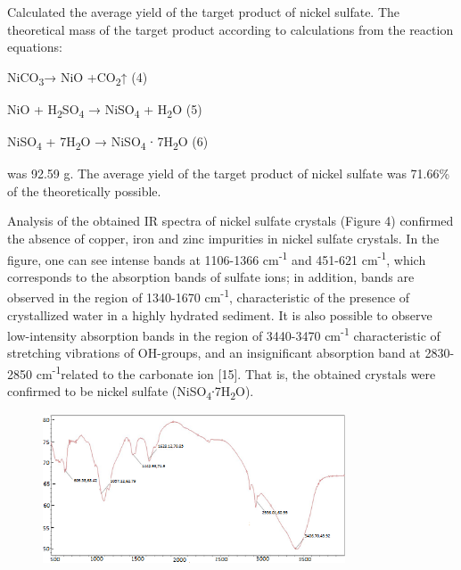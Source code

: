 
Calculated the average yield of the target product of nickel sulfate.
The theoretical mass of the target product according to calculations
from the reaction equations:

NiCO\textsubscript{3}→ NiO +CO\textsubscript{2}↑ (4)

NiO + H\textsubscript{2}SO\textsubscript{4} → NiSO\textsubscript{4} +
H\textsubscript{2}O (5)

NiSO\textsubscript{4} + 7H\textsubscript{2}O → NiSO\textsubscript{4} ∙
7H\textsubscript{2}O (6)

was 92.59 g. The average yield of the target product of nickel sulfate
was 71.66\% of the theoretically possible.

Analysis of the obtained IR spectra of nickel sulfate crystals (Figure
4) confirmed the absence of copper, iron and zinc impurities in nickel
sulfate crystals. In the figure, one can see intense bands at 1106-1366
cm\textsuperscript{-1} and 451-621 cm\textsuperscript{-1}, which
corresponds to the absorption bands of sulfate ions; in addition, bands
are observed in the region of 1340-1670 cm\textsuperscript{-1},
characteristic of the presence of crystallized water in a highly
hydrated sediment. It is also possible to observe low-intensity
absorption bands in the region of 3440-3470 cm\textsuperscript{-1}
characteristic of stretching vibrations of OH-groups, and an
insignificant absorption band at 2830-2850 cm\textsuperscript{-1}related
to the carbonate ion {[}15{]}. That is, the obtained crystals were
confirmed to be nickel sulfate
(NiSO\textsubscript{4}∙7H\textsubscript{2}O).

\begin{figure}[H]
	\centering
	\includegraphics[width=0.8\textwidth]{media/chem2/image20}
	\caption*{}
\end{figure}


